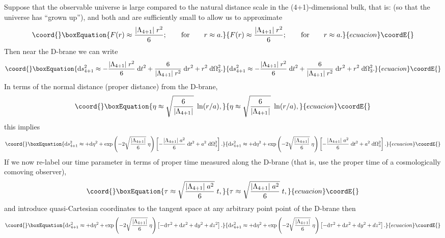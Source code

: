 \documentclass[a4paper,12pt]{article}
\begin{document}
Suppose that the observable universe is large compared to the natural
distance scale in the (4+1)-dimensional bulk, that is: \coordHE{} (so that the universe has ``grown up''),
and both \coordHE{} and \coordHE{} are sufficiently small to allow us to
approximate
%
\begin{equation}\coord{}\boxEquation{
F(r) \approx { |\Lambda_{4+1}| \; r^2 \over 6}; 
\qquad \hbox{for} \qquad 
r \approx a.
}{
F(r) \approx { |\Lambda_{4+1}| \; r^2 \over 6}; 
\qquad \hbox{for} \qquad 
r \approx a.
}{ecuacion}\coordE{}\end{equation}
%
Then near the D-brane we can write
%
\begin{equation}\coord{}\boxEquation{
\d s^2_{4+1} \approx - { |\Lambda_{4+1}| \; r^2 \over 6} \; \d t^2 
+{6\over |\Lambda_{4+1}| \; r^2} \; \d r^2 + r^2 \; \d\Omega_3^2.
}{
\d s^2_{4+1} \approx - { |\Lambda_{4+1}| \; r^2 \over 6} \; \d t^2 
+{6\over |\Lambda_{4+1}| \; r^2} \; \d r^2 + r^2 \; \d\Omega_3^2.
}{ecuacion}\coordE{}\end{equation}
%
In terms of the normal distance (proper distance) from the D-brane,
%
\begin{equation}\coord{}\boxEquation{
\eta \approx \sqrt{6\over |\Lambda_{4+1}|} \; \ln(r/a),
}{
\eta \approx \sqrt{6\over |\Lambda_{4+1}|} \; \ln(r/a),
}{ecuacion}\coordE{}\end{equation}
%
this implies
%
\begin{equation}\coord{}\boxEquation{
\d s^2_{4+1} \approx 
+\d\eta^2 
+ \exp\left(-2\sqrt{|\Lambda_{4+1}|\over6}\; \eta\right)
\left[ - { |\Lambda_{4+1}| \; a^2\over 6} \; \d t^2  + a^2 \; \d\Omega_3^2 \right].
}{
\d s^2_{4+1} \approx 
+\d\eta^2 
+ \exp\left(-2\sqrt{|\Lambda_{4+1}|\over6}\; \eta\right)
\left[ - { |\Lambda_{4+1}| \; a^2\over 6} \; \d t^2  + a^2 \; \d\Omega_3^2 \right].
}{ecuacion}\coordE{}\end{equation}
%
If we now re-label our time parameter in terms of proper time measured
along the D-brane (that is, use the proper time of a cosmologically
comoving observer),
%
\begin{equation}\coord{}\boxEquation{
\tau \approx \sqrt{|\Lambda_{4+1}| \; a^2 \over6} \; t,
}{
\tau \approx \sqrt{|\Lambda_{4+1}| \; a^2 \over6} \; t,
}{ecuacion}\coordE{}\end{equation}
%
and introduce quasi-Cartesian coordinates to the tangent space at any
arbitrary point point of the D-brane then
%
\begin{equation}\coord{}\boxEquation{
\d s^2_{4+1} \approx 
+\d\eta^2 
+ \exp\left(-2\sqrt{|\Lambda_{4+1}|\over6}\; \eta\right)
\left[ - \d\tau^2  + \d x^2 + \d y^2 + dz^2 \right].
}{
\d s^2_{4+1} \approx 
+\d\eta^2 
+ \exp\left(-2\sqrt{|\Lambda_{4+1}|\over6}\; \eta\right)
\left[ - \d\tau^2  + \d x^2 + \d y^2 + dz^2 \right].
}{ecuacion}\coordE{}\end{equation}
\end{document}

